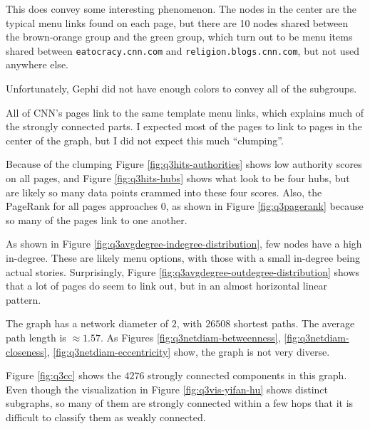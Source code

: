 \documentclass[letterpaper,11pt]{article}
\begin{document}
This does convey some interesting phenomenon.  The nodes in the center are the typical menu links found on each page, but there are 10 nodes shared between the brown-orange group and the green group, which turn out to be menu items shared between \verb+eatocracy.cnn.com+ and \verb+religion.blogs.cnn.com+, but not used anywhere else.

Unfortunately, Gephi did not have enough colors to convey all of the subgroups.

All of CNN's pages link to the same template menu links, which explains much of the strongly connected parts.  I expected most of the pages to link to pages in the center of the graph, but I did not expect this much ``clumping''.

Because of the clumping Figure \ref{fig:q3hits-authorities} shows low authority scores on all pages, and Figure \ref{fig:q3hits-hubs} shows what look to be four hubs, but are likely so many data points crammed into these four scores.  Also, the PageRank for all pages approaches $0$, as shown in Figure \ref{fig:q3pagerank} because so many of the pages link to one another.

As shown in Figure \ref{fig:q3avgdegree-indegree-distribution}, few nodes have a high in-degree.  These are likely menu options, with those with a small in-degree being actual stories.  Surprisingly, Figure \ref{fig:q3avgdegree-outdegree-distribution} shows that a lot of pages do seem to link out, but in an almost horizontal linear pattern.

The graph has a network diameter of $2$, with $26508$ shortest paths.  The average path length is $\approx 1.57$.  As Figures \ref{fig:q3netdiam-betweenness}, \ref{fig:q3netdiam-closeness}, \ref{fig:q3netdiam-eccentricity} show, the graph is not very diverse.

Figure \ref{fig:q3cc} shows the $4276$ strongly connected components in this graph.  Even though the visualization in Figure \ref{fig:q3vis-yifan-hu} shows distinct subgraphs, so many of them are strongly connected within a few hops that it is difficult to classify them as weakly connected.
\end{document}
